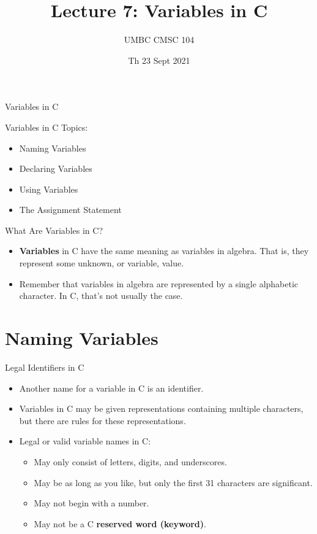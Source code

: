 \documentclass[graphics]{beamer}
\title{Lecture 7: Variables in C}
\author{UMBC CMSC 104}
\date{Th 23 Sept 2021}
\begin{document}
\begin{frame}{}
\centering
    Variables in C
\end{frame}

\begin{frame}{Variables in C}
    Topics:
    \begin{itemize}
        \item Naming Variables
        \item Declaring Variables
        \item Using Variables
        \item The Assignment Statement
    \end{itemize}
\end{frame}

\begin{frame}{What Are Variables in C?}
    \begin{itemize}
        \item \textbf{Variables} in C have the same meaning as variables in algebra. That is, they represent some unknown, or variable, value. \\
        \item Remember that variables in algebra are represented by a single alphabetic character. In C, that's not usually the case.
    \end{itemize}
\end{frame}

\section*{Naming Variables}
\begin{frame}{Legal Identifiers in C}
    \begin{itemize}
        \item Another name for a variable in C is an identifier.
        \item Variables in C may be given representations containing multiple characters, but there are rules for these representations.
        \item Legal or valid variable names in C:
        \begin{itemize}
            \item May only consist of letters, digits, and underscores.
            \item May be as long as you like, but only the first 31 characters are significant.
            \item May not begin with a number.
            \item May not be a C \textbf{reserved word (keyword)}.
        \end{itemize}
    \end{itemize}
\end{frame}
\end{document}
